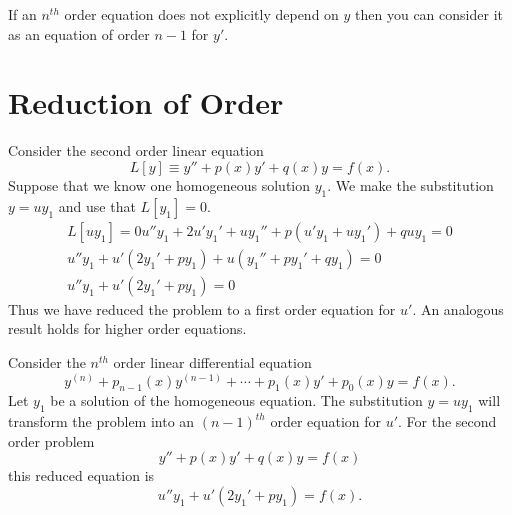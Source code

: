 \begin{Result}
  If an $n^{t h}$ order equation does not explicitly depend on $y$ then 
  you can consider it as an equation of order $n-1$ for $y'$.
\end{Result}





\section{Reduction of Order}



Consider the second order linear equation
\[ 
L[y] \equiv y'' + p(x) y' + q(x) y = f(x). 
\]
Suppose that we know one homogeneous solution $y_1$. We make the substitution 
$y = u y_1$ and use that $L[y_1] = 0$.
\begin{gather*}
  L[u y_1] = 0
  u'' y_1 + 2u' y_1' + u y_1'' + p (u' y_1 + u y_1') + q u y_1 = 0 \\
  u'' y_1 + u' ( 2 y_1' + p y_1 ) + u ( y_1'' + p y_1' + q y_1 ) = 0 \\
  u'' y_1 + u' ( 2 y_1' + p y_1 ) = 0
\end{gather*}
Thus we have reduced the problem to a first order equation for $u'$.
An analogous result holds for higher order equations.



\begin{Result}
  Consider the $n^{t h}$ order linear differential equation
  \[ 
  y^{(n)} + p_{n-1}(x) y^{(n-1)} + \cdots + p_1(x) y' + p_0(x) y = f(x).
  \]
  Let $y_1$ be a solution of the homogeneous equation.  The substitution
  $y = u y_1$ will transform the problem into an $(n-1)^{t h}$ order equation
  for $u'$.  For the second order problem 
  \[ 
  y'' + p(x) y' + q(x) y = f(x)
  \]
  this reduced equation is
  \[
  u'' y_1 + u' ( 2 y_1' + p y_1 ) = f(x).
  \]
\end{Result}



